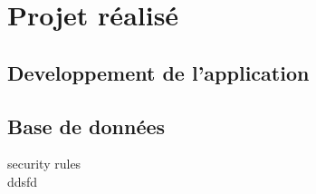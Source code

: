 \chapter{Projet réalisé}









\section{Developpement de l'application}


\section{Base de données}
security rules \\
ddsfd



